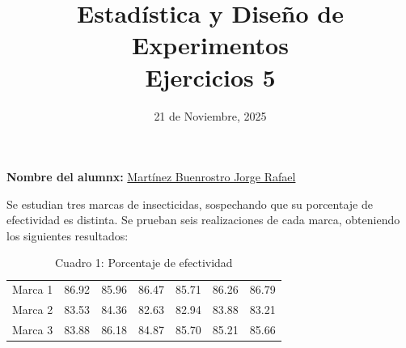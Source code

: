\documentclass[12pt,a4paper]{article}
\title{Estadística y Diseño de Experimentos\\
Ejercicios 5}
\date{21 de Noviembre, 2025}
\author{}
\begin{document}
\maketitle

\noindent\textbf{Nombre del alumnx:} \underline{\hspace{0.5cm}Martínez Buenrostro Jorge Rafael\hspace{0.5cm}}

\vspace{1cm}

Se estudian tres marcas de insecticidas, sospechando que su porcentaje de efectividad es distinta. Se prueban seis realizaciones de cada marca, obteniendo los siguientes resultados:

\begin{table}[H]
  \centering
  \begin{tabular}{@{}l|llllll@{}}
    \toprule
    Marca 1 & 86.92 & 85.96 & 86.47 & 85.71 & 86.26 & 86.79 \\
    Marca 2 & 83.53 & 84.36 & 82.63 & 82.94 & 83.88 & 83.21 \\
    Marca 3 & 83.88 & 86.18 & 84.87 & 85.70 & 85.21 & 85.66 \\ \bottomrule
  \end{tabular}
  \caption{Cuadro 1: Porcentaje de efectividad}
\end{table}
\end{document}
